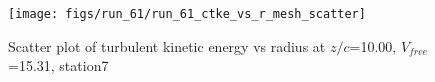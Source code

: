 \begin{figure}[H]
\centering
\texttt{[image: figs/run\_61/run\_61\_ctke\_vs\_r\_mesh\_scatter]}
\caption{Scatter plot of turbulent kinetic energy vs radius at $z/c$=10.00, $V_{free}$=15.31, station7}
\label{fig:run_61_ctke_vs_r_mesh_scatter}
\end{figure}


